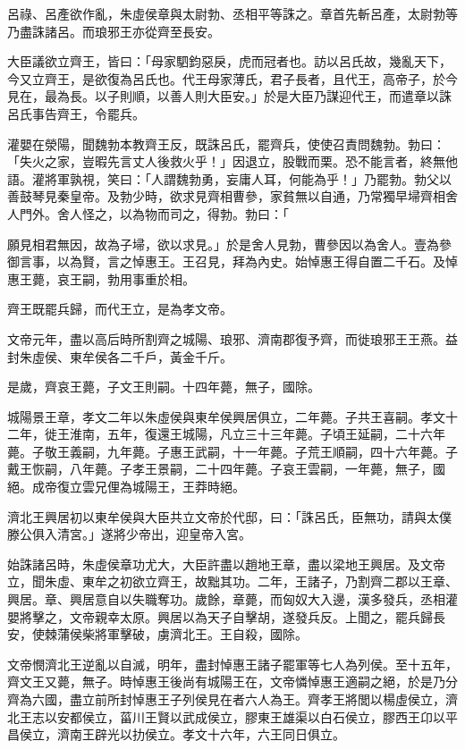 \begin{pinyinscope}
呂祿、呂產欲作亂，朱虛侯章與太尉勃、丞相平等誅之。章首先斬呂產，太尉勃等乃盡誅諸呂。而琅邪王亦從齊至長安。

大臣議欲立齊王，皆曰：「母家駟鈞惡戾，虎而冠者也。訪以呂氏故，幾亂天下，今又立齊王，是欲復為呂氏也。代王母家薄氏，君子長者，且代王，高帝子，於今見在，最為長。以子則順，以善人則大臣安。」於是大臣乃謀迎代王，而遣章以誅呂氏事告齊王，令罷兵。

灌嬰在滎陽，聞魏勃本教齊王反，既誅呂氏，罷齊兵，使使召責問魏勃。勃曰：「失火之家，豈暇先言丈人後救火乎！」因退立，股戰而栗。恐不能言者，終無他語。灌將軍孰視，笑曰：「人謂魏勃勇，妄庸人耳，何能為乎！」乃罷勃。勃父以善鼓琴見秦皇帝。及勃少時，欲求見齊相曹參，家貧無以自通，乃常獨早埽齊相舍人門外。舍人怪之，以為物而司之，得勃。勃曰：「

願見相君無因，故為子埽，欲以求見。」於是舍人見勃，曹參因以為舍人。壹為參御言事，以為賢，言之悼惠王。王召見，拜為內史。始悼惠王得自置二千石。及悼惠王薨，哀王嗣，勃用事重於相。

齊王既罷兵歸，而代王立，是為孝文帝。

文帝元年，盡以高后時所割齊之城陽、琅邪、濟南郡復予齊，而徙琅邪王王燕。益封朱虛侯、東牟侯各二千戶，黃金千斤。

是歲，齊哀王薨，子文王則嗣。十四年薨，無子，國除。

城陽景王章，孝文二年以朱虛侯與東牟侯興居俱立，二年薨。子共王喜嗣。孝文十二年，徙王淮南，五年，復還王城陽，凡立三十三年薨。子頃王延嗣，二十六年薨。子敬王義嗣，九年薨。子惠王武嗣，十一年薨。子荒王順嗣，四十六年薨。子戴王恢嗣，八年薨。子孝王景嗣，二十四年薨。子哀王雲嗣，一年薨，無子，國絕。成帝復立雲兄俚為城陽王，王莽時絕。

濟北王興居初以東牟侯與大臣共立文帝於代邸，曰：「誅呂氏，臣無功，請與太僕滕公俱入清宮。」遂將少帝出，迎皇帝入宮。

始誅諸呂時，朱虛侯章功尤大，大臣許盡以趙地王章，盡以梁地王興居。及文帝立，聞朱虛、東牟之初欲立齊王，故黜其功。二年，王諸子，乃割齊二郡以王章、興居。章、興居意自以失職奪功。歲餘，章薨，而匈奴大入邊，漢多發兵，丞相灌嬰將擊之，文帝親幸太原。興居以為天子自擊胡，遂發兵反。上聞之，罷兵歸長安，使棘蒲侯柴將軍擊破，虜濟北王。王自殺，國除。

文帝憫濟北王逆亂以自滅，明年，盡封悼惠王諸子罷軍等七人為列侯。至十五年，齊文王又薨，無子。時悼惠王後尚有城陽王在，文帝憐悼惠王適嗣之絕，於是乃分齊為六國，盡立前所封悼惠王子列侯見在者六人為王。齊孝王將閭以楊虛侯立，濟北王志以安都侯立，菑川王賢以武成侯立，膠東王雄渠以白石侯立，膠西王卬以平昌侯立，濟南王辟光以扐侯立。孝文十六年，六王同日俱立。


\end{pinyinscope}
